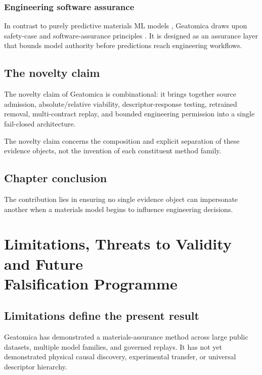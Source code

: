 \documentclass[11pt,a4paper,oneside]{report}
\begin{document}
\subsection{Engineering software assurance}
In contrast to purely predictive materials ML models \cite{ramprasad2017machine, merchant2023scaling}, Geatomica draws upon safety-case and software-assurance principles \cite{leveson2011engineering, kelly1998arguing, hatcliff2014rationale}. It is designed as an assurance layer that bounds model authority before predictions reach engineering workflows.

\section{The novelty claim}
The novelty claim of Geatomica is combinational: it brings together source admission, absolute/relative viability, descriptor-response testing, retrained removal, multi-contract replay, and bounded engineering permission into a single fail-closed architecture.

The novelty claim concerns the composition and explicit separation of these evidence
objects, not the invention of each constituent method family.

\section{Chapter conclusion}
The contribution lies in ensuring no single evidence object can impersonate another when a materials model begins to influence engineering decisions.



\chapter[Limitations, Threats and Future Falsification]{Limitations, Threats to Validity and Future\\ Falsification Programme}
\label{chap:limitations}

\section{Limitations define the present result}
Geatomica has demonstrated a materials-assurance method across large public datasets, multiple model families, and governed replays. It has not yet demonstrated physical causal discovery, experimental transfer, or universal descriptor hierarchy.
\end{document}
